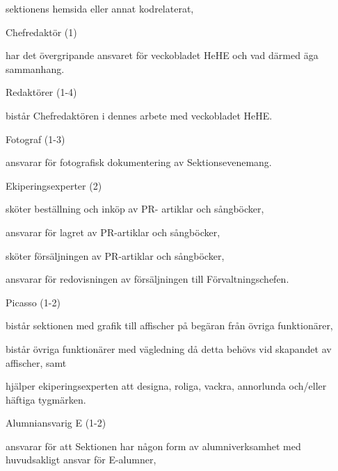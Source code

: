 \documentclass[10pt]{article}
\begin{document}
\begin{emptylist}
\begin{dashlist}
                sektionens hemsida eller annat kodrelaterat,
        \end{dashlist}
    \item Chefredaktör (1)
    		\begin{dashlist}
    			\item har det övergripande ansvaret för veckobladet HeHE och vad därmed äga sammanhang.
    		\end{dashlist}
    	\item Redaktörer (1-4)
    		\begin{dashlist}
    			\item bistår Chefredaktören i dennes arbete med veckobladet HeHE.
    		\end{dashlist}
    \item Fotograf (1-3)
        \begin{dashlist}
            \item ansvarar för fotografisk dokumentering av Sektionsevenemang.
        \end{dashlist}
    \item Ekiperingsexperter (2)
        \begin{dashlist}
            \item sköter beställning och inköp av PR- artiklar och sångböcker,
            \item ansvarar för lagret av PR-artiklar och sångböcker,
            \item sköter försäljningen av PR-artiklar och sångböcker,
            \item ansvarar för redovisningen av försäljningen till Förvaltningschefen.
        \end{dashlist}
    \item Picasso (1-2)
		\begin{dashlist}
            \item bistår sektionen med grafik till affischer på begäran från övriga funktionärer,
            \item bistår övriga funktionärer med vägledning då detta behövs vid skapandet av affischer, samt
            \item hjälper ekiperingsexperten att designa, roliga, vackra, annorlunda och/eller häftiga tygmärken.
        \end{dashlist}
    \item Alumniansvarig E (1-2)
        \begin{dashlist}
            \item ansvarar för att Sektionen har någon form av alumniverksamhet med huvudsakligt ansvar för E-alumner,

\end{dashlist}
\end{emptylist}
\end{document}

